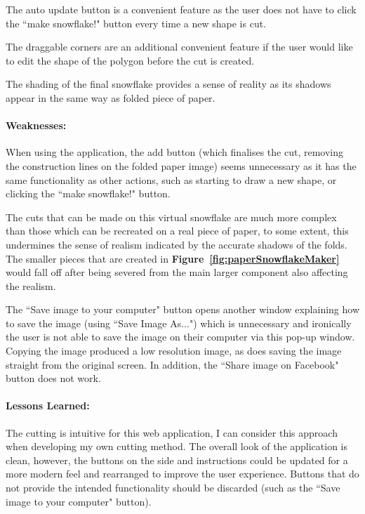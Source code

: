 \documentclass[11pt]{article}
\begin{document}
                The auto update button is a convenient feature as the user does not have to click the ``make snowflake!" button every time a new shape is cut. 
                
                The draggable corners are an additional convenient feature if the user would like to edit the shape of the polygon before the cut is created.
                 
                 The shading of the final snowflake provides a sense of reality as its shadows appear in the same way as folded piece of paper.
                 
                \paragraph{Weaknesses:}
                When using the application, the add button (which finalises the cut, removing the construction lines on the folded paper image) seems unnecessary as it has the same functionality as other actions, such as starting to draw a new shape, or clicking the ``make snowflake!" button.
                
                The cuts that can be made on this virtual snowflake are much more complex than those which can be recreated on a real piece of paper, to some extent, this undermines the sense of realism indicated by the accurate shadows of the folds. The smaller pieces that are created in \textbf{Figure~\ref{fig:paperSnowflakeMaker}} would fall off after being severed from the main larger component also affecting the realism.
                
                The ``Save image to your computer" button opens another window explaining how to save the image (using ``Save Image As...") which is unnecessary and ironically the user is not able to save the image on their computer via this pop-up window. Copying the image produced a low resolution image, as does saving the image straight from the original screen. In addition, the ``Share image on Facebook" button does not work.
            
                \paragraph{Lessons Learned:}
                The cutting is intuitive for this web application, I can consider this approach when developing my own cutting method. The overall look of the application is clean, however, the buttons on the side and instructions could be updated for a more modern feel and rearranged to improve the user experience. Buttons that do not provide the intended functionality should be discarded (such as the ``Save image to your computer" button).
                
\end{document}
